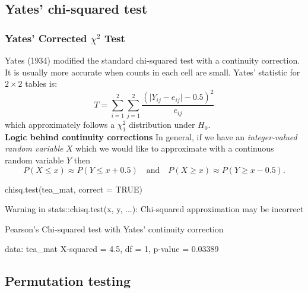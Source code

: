 \documentclass[a4paper]{article}
\begin{document}
\subsection{Yates' chi-squared test}
\subsubsection{Yates' Corrected \( \chi^2 \) Test}
Yates (1934) modified the standard chi-squared test with a continuity correction. It is usually more accurate when counts in each cell are small. Yates' statistic for \( 2 \times 2 \) tables is:
\[
	T = \sum_{i=1}^2\sum_{j=1}^2 \frac{(\lvert Y_{ij} - e_{ij} \rvert - 0.5)^2}{e_{ij}}
\]
which approximately follows a \( \chi^2_1 \) distribution under \( H_0 \).\\
\textbf{Logic behind continuity corrections}
In general, if we have an \textit{integer-valued random variable} \( X \) which we would like to approximate with a continuous random variable \( Y \) then
\[
	P(X \leq x) \approx P(Y \leq x + 0.5) \quad \text{and} \quad P(X \geq x) \approx P(Y \geq x - 0.5).
\]
\begin{Schunk}
\begin{Sinput}
chisq.test(tea_mat, correct = TRUE)
\end{Sinput}
\begin{Soutput}
Warning in stats::chisq.test(x, y, ...): Chi-squared approximation may be incorrect
\end{Soutput}
\begin{Soutput}

	Pearson's Chi-squared test with Yates' continuity correction

data:  tea_mat
X-squared = 4.5, df = 1, p-value = 0.03389
\end{Soutput}
\end{Schunk}
\subsection{Permutation testing}
\end{document}
